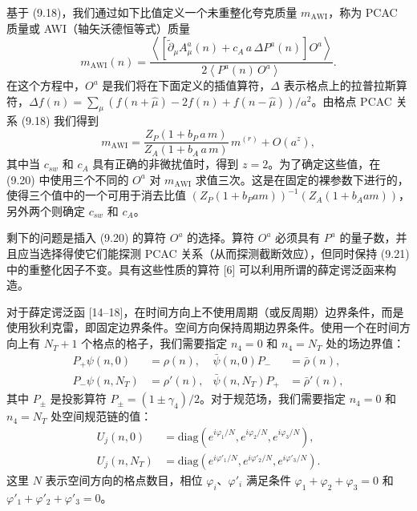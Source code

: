 基于 (9.18)，我们通过如下比值定义一个未重整化夸克质量 $m_{\mathrm{AWI}}$，称为 PCAC 质量或 AWI（轴矢沃德恒等式）质量
\begin{equation}
  m_{\mathrm{AWI}}(n)
  = \frac{\left\langle \left[\widetilde{\partial}_\mu A^a_\mu(n) + c_A\,a\,\Delta P^a(n)\right] O^a \right\rangle}
         {2\left\langle P^a(n)\,O^a \right\rangle} .
\end{equation}
在这个方程中，$O^a$ 是我们将在下面定义的插值算符，$\Delta$ 表示格点上的拉普拉斯算符，$\Delta f(n) = \sum_\mu (f(n + \hat\mu) - 2f(n) + f(n - \hat\mu))/a^2$。由格点 PCAC 关系 (9.18) 我们得到
\begin{equation}
  m_{\mathrm{AWI}} = \frac{Z_P(1 + b_P\,a\,m)}{Z_A(1 + b_A\,a\,m)}\,m^{(r)} + O(a^z) ,
\end{equation}
其中当 $c_{sw}$ 和 $c_A$ 具有正确的非微扰值时，得到 $z = 2$。为了确定这些值，在 (9.20) 中使用三个不同的 $O^a$ 对 $m_{\mathrm{AWI}}$ 求值三次。这是在固定的裸参数下进行的，使得三个值中的一个可用于消去比值 $(Z_P(1+b_P am))^{-1}(Z_A(1+b_A am))$，另外两个则确定 $c_{sw}$ 和 $c_A$。

剩下的问题是插入 (9.20) 的算符 $O^a$ 的选择。算符 $O^a$ 必须具有 $P^a$ 的量子数，并且应当选择得使它们能探测 PCAC 关系（从而探测截断效应），但同时保持 (9.21) 中的重整化因子不变。具有这些性质的算符 [6] 可以利用所谓的薛定谔泛函来构造。

对于薛定谔泛函 [14--18]，在时间方向上不使用周期（或反周期）边界条件，而是使用狄利克雷，即固定边界条件。空间方向保持周期边界条件。使用一个在时间方向上有 $N_T + 1$ 个格点的格子，我们需要指定 $n_4 = 0$ 和 $n_4 = N_T$ 处的场边界值：
\begin{align}
  P_+\psi(n,0) &= \rho(n) , & \bar\psi(n,0)P_- &= \bar\rho(n) , \nonumber\\
  P_-\psi(n,N_T) &= \rho'(n) , & \bar\psi(n,N_T)P_+ &= \bar\rho'(n) ,
\end{align}
其中 $P_\pm$ 是投影算符 $P_\pm = (1 \pm \gamma_4)/2$。对于规范场，我们需要指定 $n_4 = 0$ 和 $n_4 = N_T$ 处空间规范链的值：
\begin{align}
  U_j(n,0) &= \mathrm{diag}\left(e^{i\varphi_1/N}, e^{i\varphi_2/N}, e^{i\varphi_3/N}\right) , \nonumber\\
  U_j(n,N_T) &= \mathrm{diag}\left(e^{i\varphi'_1/N}, e^{i\varphi'_2/N}, e^{i\varphi'_3/N}\right) .
\end{align}
这里 $N$ 表示空间方向的格点数目，相位 $\varphi_i$、$\varphi'_i$ 满足条件 $\varphi_1 + \varphi_2 + \varphi_3 = 0$ 和 $\varphi'_1 + \varphi'_2 + \varphi'_3 = 0$。

